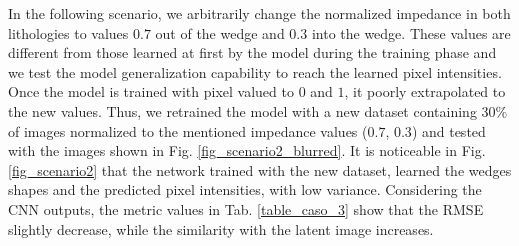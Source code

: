 \documentclass[conference]{IEEEtran}
\begin{document}
In the following scenario, we arbitrarily change the normalized impedance in both
lithologies to values $ 0.7 $ out of the wedge and $ 0.3$ into the wedge.
These values are different from those learned at first by the model during the
training phase and we test the model generalization capability to reach
the learned pixel intensities. Once the model is trained with pixel valued to
$ 0 $ and $ 1 $, it poorly extrapolated to the new values. Thus, we retrained the model with a new dataset containing $30\%$
of images normalized to the mentioned impedance values ($0.7$, $0.3$) and tested with the images shown in Fig. \ref{fig_scenario2_blurred}. It is noticeable in Fig. \ref{fig_scenario2} that the network trained with the new dataset, learned
the wedges shapes and the predicted pixel intensities, with low variance. Considering the CNN outputs, the metric values in Tab. \ref{table_caso_3}
show that the RMSE slightly decrease, while the similarity with the latent image increases.
\end{document}
